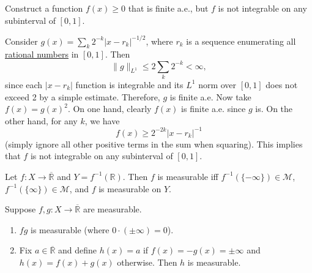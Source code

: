   \begin{exercise}
    Construct a function $f(x)\ge0$ that is finite a.e., but $f$ is not integrable on any subinterval of $[0, 1]$.
  \end{exercise}
  \begin{solution}
    Consider $g(x)=\sum_{k}2^{-k}|x-r_{k}|^{-1/2}$, where $r_{k}$ is a sequence enumerating all \hyperref[alg-def:rational-numbers]{rational numbers} in $[0, 1]$. Then
    \begin{equation}
      \|g\|_{L^{1}}\le2\sum_{k}2^{-k}<\infty,
    \end{equation}
    since each $|x-r_{k}|$ function is integrable and its $L^{1}$ norm over $[0, 1]$ does not exceed 2 by a simple estimate. Therefore, $g$ is finite a.e. Now take $f(x)=g(x)^{2}$. On one hand, clearly $f(x)$ is finite a.e. since $g$ is. On the other hand, for any $k$, we have
    \begin{equation}
      f(x)\ge2^{-2k}|x-r_{k}|^{-1}
    \end{equation}
    (simply ignore all other positive terms in the sum when squaring). This implies that $f$ is not integrable on any subinterval of $[0, 1]$.
  \end{solution}

	\begin{exercise}[Folland 2.1]
		Let $f : X \to \overline{\mathbb{R}}$ and $Y = f^{-1}(\mathbb{R})$. Then $f$ is measurable iff $f^{-1}(\{-\infty\}) \in \mathcal{M}$, $f^{-1}(\{\infty\}) \in \mathcal{M}$, and $f$ is measurable on $Y$.
	\end{exercise}
	\begin{solution}

	\end{solution}

	\begin{exercise}[Folland 2.2]
		Suppose $f, g : X \to \overline{\mathbb{R}}$ are measurable.
		\begin{enumerate}[label=\textbf{\alph*.}]
			\item $fg$ is measurable (where $0 \cdot (\pm\infty) = 0$).
			\item Fix $a \in \overline{\mathbb{R}}$ and define $h(x) = a$ if $f(x) = -g(x) = \pm\infty$ and $h(x) = f(x) + g(x)$ otherwise. Then $h$ is measurable.
		\end{enumerate}
	\end{exercise}
	\begin{solution}

	\end{solution}

